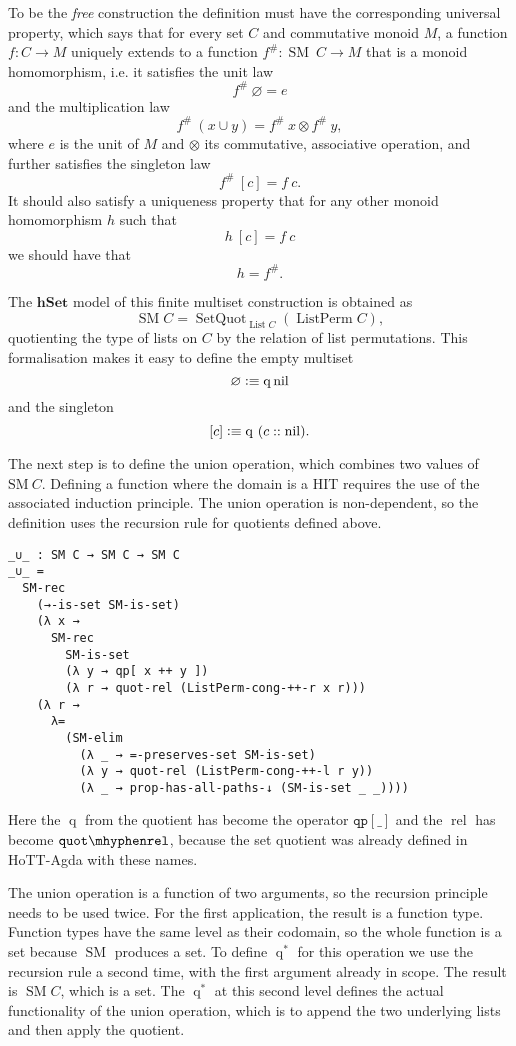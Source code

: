 \documentclass[12pt, parskip, DIV=14]{scrbook}
\newcommand{\defeq}{\vcentcolon\equiv}
\newcommand{\SM}{\operatorname{SM}}
\newcommand{\hSet}{\mathbf{hSet}}
\newcommand{\List}{\operatorname{List}}
\newcommand{\q}{\operatorname{q}}
\newcommand{\rel}{\operatorname{rel}}
\newcommand{\qs}{\operatorname{q}^*}
\newcommand{\ListPerm}{\operatorname{ListPerm}}
\newcommand{\nil}{\operatorname{nil}}
\begin{document}
To be the \textit{free} construction the definition must have the corresponding universal property, which says that for every set $C$ and commutative monoid $M$, a function $f : C \to M$ uniquely extends to a function $f^\# : \SM~C \to M$ that is a monoid homomorphism, i.e. it satisfies the unit law $$f^\#~\varnothing = e$$ and the multiplication law $$f^\#~(x \cup y) = f^\#~x \otimes f^\#~y,$$ where $e$ is the unit of $M$ and $\otimes$ its commutative, associative operation, and further satisfies the singleton law
$$f^\#~[c] = f~c.$$ It should also satisfy a uniqueness property that for any other monoid homomorphism $h$ such that
$$h~[c] = f~c$$ we should have that $$h = f^\#.$$

The $\hSet$ model of this finite multiset construction is obtained as
$$\SM C = \operatorname{SetQuot}_{\List C}(\ListPerm C),$$ quotienting the type of lists on $C$ by the relation of list permutations. This formalisation makes it easy to define the empty multiset
$$\varnothing \defeq \q \nil$$ and the singleton $$[c] \defeq \q~(c :: \nil).$$

The next step is to define the union operation, which combines two values of $\mathrm{SM}~C$. Defining a function where the domain is a HIT requires the use of the associated induction principle. The union operation is non-dependent, so the definition uses the recursion rule for quotients defined above.
{\small
\begin{verbatim}
_∪_ : SM C → SM C → SM C
_∪_ =
  SM-rec
    (→-is-set SM-is-set)
    (λ x →
      SM-rec
        SM-is-set
        (λ y → qp[ x ++ y ])
        (λ r → quot-rel (ListPerm-cong-++-r x r)))
    (λ r →
      λ=
        (SM-elim
          (λ _ → =-preserves-set SM-is-set)
          (λ y → quot-rel (ListPerm-cong-++-l r y))
          (λ _ → prop-has-all-paths-↓ (SM-is-set _ _))))
\end{verbatim}}
Here the $\q$ from the quotient has become the operator $\mathtt{qp[\_]}$ and the $\rel$ has become $\mathtt{quot\mhyphen rel}$, because the set quotient was already defined in HoTT-Agda with these names.

The union operation is a function of two arguments, so the recursion principle needs to be used twice. For the first application, the result is a function type. Function types have the same level as their codomain, so the whole function is a set because $\SM$ produces a set. To define $\qs$ for this operation we use the recursion rule a second time, with the first argument already in scope. The result is $\SM C$, which is a set. The $\qs$ at this second level defines the actual functionality of the union operation, which is to append the two underlying lists and then apply the quotient.
\end{document}
